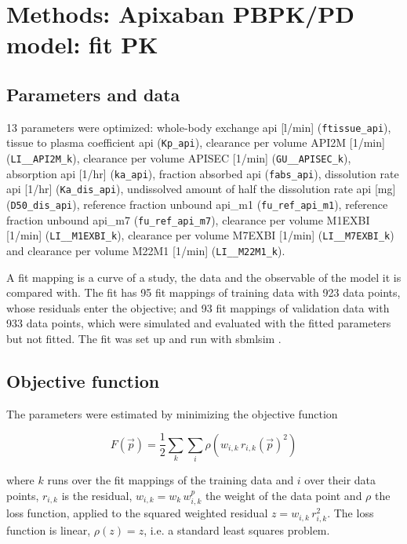 \section{Methods: Apixaban PBPK/PD model: fit PK}

\subsection{Parameters and data}

13 parameters were optimized: whole-body exchange api [l/min] (\texttt{ftissue\_api}), tissue to plasma coefficient api (\texttt{Kp\_api}), clearance per volume API2M [1/min] (\texttt{LI\_\_API2M\_k}), clearance per volume APISEC [1/min] (\texttt{GU\_\_APISEC\_k}), absorption api [1/hr] (\texttt{ka\_api}), fraction absorbed api (\texttt{fabs\_api}), dissolution rate api [1/hr] (\texttt{Ka\_dis\_api}), undissolved amount of half the dissolution rate api [mg] (\texttt{D50\_dis\_api}), reference fraction unbound api\_m1 (\texttt{fu\_ref\_api\_m1}), reference fraction unbound api\_m7 (\texttt{fu\_ref\_api\_m7}), clearance per volume M1EXBI [1/min] (\texttt{LI\_\_M1EXBI\_k}), clearance per volume M7EXBI [1/min] (\texttt{LI\_\_M7EXBI\_k}) and clearance per volume M22M1 [1/min] (\texttt{LI\_\_M22M1\_k}).

A fit mapping is a curve of a study, the data and the observable of the model it is compared with. The fit has 95 fit mappings of training data with 923 data points, whose residuals enter the objective; and 93 fit mappings of validation data with 933 data points, which were simulated and evaluated with the fitted parameters but not fitted. The fit was set up and run with sbmlsim \cite{Koenig2026_sbmlsim}.

\subsection{Objective function}

The parameters were estimated by minimizing the objective function

\begin{equation}
F(\vec{p}) = \frac{1}{2} \sum_{k} \sum_{i} \rho\left(w_{i,k}\, r_{i,k}(\vec{p})^2\right)
\end{equation}

where $k$ runs over the fit mappings of the training data and $i$ over their data points, $r_{i,k}$ is the residual, $w_{i,k} = w_k\, w^{p}_{i,k}$ the weight of the data point and $\rho$ the loss function, applied to the squared weighted residual $z = w_{i,k}\, r_{i,k}^2$. The loss function is linear, $\rho(z) = z$, i.e. a standard least squares problem.

